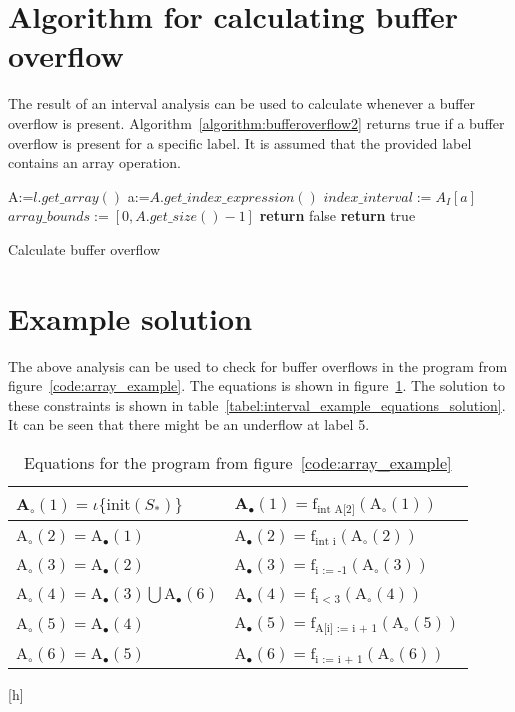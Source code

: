 \section{Algorithm for calculating buffer overflow}
The result of an interval analysis can be used to calculate whenever a buffer overflow is present. Algorithm~\ref{algorithm:bufferoverflow2} returns true if a buffer overflow is present for a specific label. It is assumed that the provided label contains an array operation.
\begin{algorithm}
 \begin{algorithmic}[1]
\State A:=$l.get\_array()$
\State a:=$A.get\_index\_expression()$
\State $index\_interval:=A_I[a]$
\State $array\_bounds:=[0,A.get\_size()-1]$
\State \textbf{return} false
\Else
\State \textbf{return} true
\EndIf 
 \EndProcedure
 \end{algorithmic}
 \caption{Calculate buffer overflow}
 \label{algorithm:bufferoverflow2}
\end{algorithm}

\section{Example solution}
The above analysis can be used to check for buffer overflows in the program from figure~\ref{code:array_example}. The equations is shown in figure~\ref{table:interval_equations}. The solution to these constraints is shown in table~\ref{tabel:interval_example_equations_solution}. It can be seen that there might be an underflow at label 5.
\begin{table}[h]
\begin{tabular}{| l | l |}
\hline
A$_\circ (1) = \iota \{\text{init}(S_*) \} $ & A$_\bullet(1) = \text{f}_{\text{int A[2]}} (\text{A}_\circ (1))$ \\
\hline
A$_\circ (2) =$A$_\bullet(1) $ & A$_\bullet(2) = \text{f}_{\text{int i}} (\text{A}_\circ (2))$ \\
\hline
A$_\circ (3) = $A$_\bullet(2)$ & A$_\bullet(3) = \text{f}_{\text{i := -1}} (\text{A}_\circ (3))$  \\
\hline
A$_\circ (4) = $A$_\bullet(3) \bigcup $A$_\bullet(6) $ & A$_\bullet(4) = \text{f}_{\text{i < 3}} (\text{A}_\circ (4))$ \\
\hline
A$_\circ (5) = $A$_\bullet(4)$ & A$_\bullet(5) = \text{f}_{\text{A[i] := i + 1}} (\text{A}_\circ (5))$ \\
\hline
A$_\circ (6) = $A$_\bullet(5)$ & A$_\bullet(6) = \text{f}_{\text{i := i + 1}} (\text{A}_\circ (6))$ \\

\hline
\end{tabular}[h]
\centering
\caption{Equations for the program from figure~\ref{code:array_example}}
\label{table:interval_equations}
\end{table}

